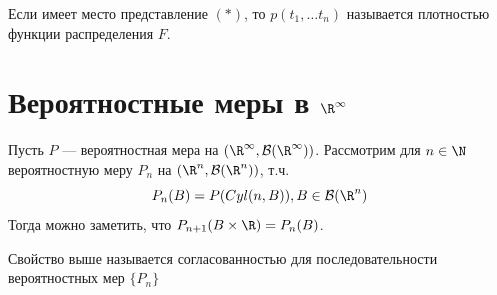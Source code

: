 \begin{definition}
    Если имеет место представление \((*)\), то \(p(t_1, \dots t_n)\) называется плотностью функции распределения \(F\).
\end{definition}

\section{Вероятностные меры в \(\R^\infty\)}

\begin{definition}
    Пусть \(P\) --- вероятностная мера на \((\R^{\infty}, \mathcal{B}(\R^\infty))\). Рассмотрим для \(n \in \N\) вероятностную меру \(P_n\) на \((\R^n, \mathcal{B}(\R^n))\), т.ч.
    \[P_n(B) = P(Cyl(n, B)), B \in \mathcal{B}(\R^n)\]
    Тогда можно заметить, что \(P_{n + 1}(B \times \R) = P_n(B)\).
\end{definition}

\begin{definition}
    Свойство выше называется согласованностью для последовательности вероятностных мер \(\{P_n\}\)
\end{definition}

